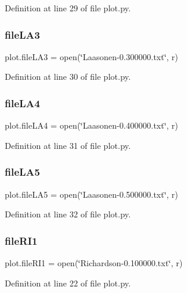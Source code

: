 Definition at line 29 of file plot.\+py.

\mbox{\label{namespaceplot_ae0d1bccff373e1b2c97516a289c98885}} 
\subsubsection{file\+L\+A3}
{\footnotesize\ttfamily plot.\+file\+L\+A3 = open(\char`\"{}Laasonen-\/0.\+300000.txt\char`\"{}, \textquotesingle{}r\textquotesingle{})}



Definition at line 30 of file plot.\+py.

\mbox{\label{namespaceplot_a342c3ff0e63abb22b1d848e7d88b7711}} 
\subsubsection{file\+L\+A4}
{\footnotesize\ttfamily plot.\+file\+L\+A4 = open(\char`\"{}Laasonen-\/0.\+400000.txt\char`\"{}, \textquotesingle{}r\textquotesingle{})}



Definition at line 31 of file plot.\+py.

\mbox{\label{namespaceplot_a37c4b3d7b8275cde4f489ca350a2741b}} 
\subsubsection{file\+L\+A5}
{\footnotesize\ttfamily plot.\+file\+L\+A5 = open(\char`\"{}Laasonen-\/0.\+500000.txt\char`\"{}, \textquotesingle{}r\textquotesingle{})}



Definition at line 32 of file plot.\+py.

\mbox{\label{namespaceplot_aee1be48b0f8bbe69827552324e0a04c8}} 
\subsubsection{file\+R\+I1}
{\footnotesize\ttfamily plot.\+file\+R\+I1 = open(\char`\"{}Richardson-\/0.\+100000.txt\char`\"{}, \textquotesingle{}r\textquotesingle{})}



Definition at line 22 of file plot.\+py.

